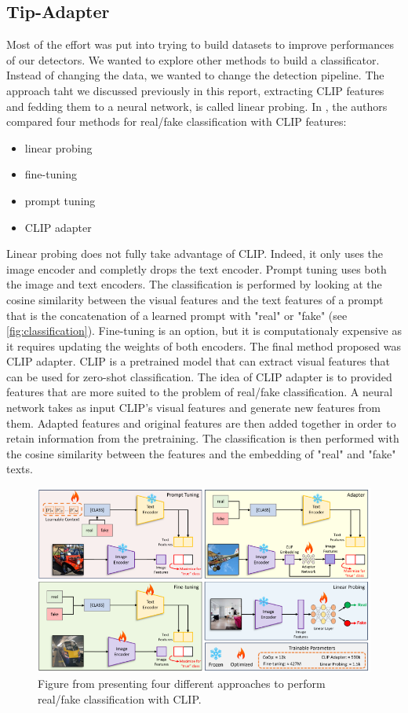 \documentclass[12pt,a4paper]{article}
\begin{document}
\subsection{Tip-Adapter}
Most of the effort was put into trying to build datasets to improve performances of our detectors. We wanted to explore other methods to build a classificator. Instead of changing the data, we wanted to change the detection pipeline. The approach taht we discussed previously in this report, extracting CLIP features and fedding them to a neural network, is called linear probing. In \autocite*{khanCLIPpingDeceptionAdapting2024}, the authors compared four methods for real/fake classification with CLIP features:
\begin{itemize}
    \item linear probing
    \item fine-tuning
    \item prompt tuning
    \item CLIP adapter
\end{itemize}
Linear probing does not fully take advantage of CLIP. Indeed, it only uses the image encoder and completly drops the text encoder. Prompt tuning uses both the image and text encoders. The classification is performed by looking at the cosine similarity between the visual features and the text features of a prompt that is the concatenation of a learned prompt with "real" or "fake" (see \autoref*{fig:classification}).
Fine-tuning is an option, but it is computationaly expensive as it requires updating the weights of both encoders. The final method proposed was CLIP adapter. CLIP is a pretrained model that can extract visual features that can be used for zero-shot classification. The idea of CLIP adapter is to provided features that are more suited to the problem of real/fake classification. A neural network takes as input CLIP's visual features and generate new features from them. Adapted features and original features are then added together in order to retain information from the pretraining. The classification is then performed with the cosine similarity between the features and the embedding of "real" and "fake" texts. 

\begin{figure}[H]
    \includegraphics*[width=\textwidth]{img/classification.png}
    \caption{Figure from \autocite*{khanCLIPpingDeceptionAdapting2024} presenting four different approaches to perform real/fake classification with CLIP.}
    \label{fig:classification}
\end{figure}
\end{document}
